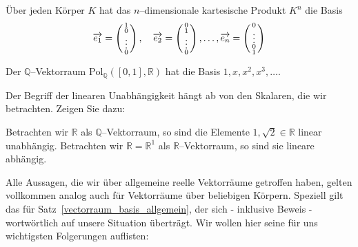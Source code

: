 \begin{beispiel} Über jeden Körper $K$ hat das $n$--dimensionale kartesische Produkt 
$K^n$ die Basis
  	$$ \overrightarrow{e_1} = 
 	\left( \begin{smallmatrix} 1 \\ 0 \\ \vdots \\ 0 \end{smallmatrix} \right), \quad 
  	\overrightarrow{e_2} = \left( \begin{smallmatrix} 0 \\ 1 \\ \vdots \\ 0 
  	\end{smallmatrix} \right), \ldots , \overrightarrow{e_n} = \left( \begin{smallmatrix} 
   	0 \\ \vdots \\ 0 \\ 1 \end{smallmatrix} \right) $$
\end{beispiel}

\begin{beispiel} Der $\mathbb Q$--Vektorraum $\textrm{Pol}_{\mathbb Q}([0,1], 
\mathbb R)$ hat die Basis $1, x, x^2, x^3, \ldots $.
\end{beispiel}

\begin{aufgabe} Der Begriff der linearen Unabhängigkeit hängt ab von den Skalaren, 
die wir betrachten. Zeigen Sie dazu:

Betrachten wir $\mathbb R$ als $\mathbb Q$--Vektorraum, so sind die Elemente $1, 
\sqrt{2} \in \mathbb R$ linear unabhängig. Betrachten wir $\mathbb R = \mathbb R^1$ 
als $\mathbb R$--Vektorraum, so sind sie lineare abhängig.
\end{aufgabe}

\bigbreak

Alle Aussagen, die wir über allgemeine reelle Vektorräume getroffen haben, gelten 
vollkommen analog auch für Vektorräume über beliebigen Körpern. Speziell gilt 
das für Satz~\ref{vectorraum_basis_allgemein}, der sich  - inklusive Beweis - 
wortwörtlich auf unsere Situation überträgt. Wir wollen hier seine für uns 
wichtigsten Folgerungen auflisten:

